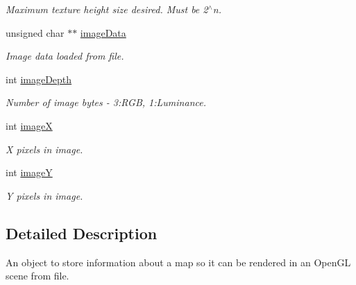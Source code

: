 \begin{DoxyCompactItemize}
\begin{DoxyCompactList}\small\item\em Maximum texture height size desired. Must be 2$^\wedge$n. \end{DoxyCompactList}\item 
\hypertarget{class_geomap3_d_af2812be26b02da4603e32159f199d3de}{
unsigned char $\ast$$\ast$ \hyperlink{class_geomap3_d_af2812be26b02da4603e32159f199d3de}{imageData}}
\label{class_geomap3_d_af2812be26b02da4603e32159f199d3de}

\begin{DoxyCompactList}\small\item\em Image data loaded from file. \end{DoxyCompactList}\item 
\hypertarget{class_geomap3_d_a6eb34415f8711c175c3e2de62fce649f}{
int \hyperlink{class_geomap3_d_a6eb34415f8711c175c3e2de62fce649f}{imageDepth}}
\label{class_geomap3_d_a6eb34415f8711c175c3e2de62fce649f}

\begin{DoxyCompactList}\small\item\em Number of image bytes -\/ 3:RGB, 1:Luminance. \end{DoxyCompactList}\item 
\hypertarget{class_geomap3_d_a727dff35321b9f86360873dea21825d3}{
int \hyperlink{class_geomap3_d_a727dff35321b9f86360873dea21825d3}{imageX}}
\label{class_geomap3_d_a727dff35321b9f86360873dea21825d3}

\begin{DoxyCompactList}\small\item\em X pixels in image. \end{DoxyCompactList}\item 
\hypertarget{class_geomap3_d_afa780dc6562152adfc5226951aca934d}{
int \hyperlink{class_geomap3_d_afa780dc6562152adfc5226951aca934d}{imageY}}
\label{class_geomap3_d_afa780dc6562152adfc5226951aca934d}

\begin{DoxyCompactList}\small\item\em Y pixels in image. \end{DoxyCompactList}\end{DoxyCompactItemize}


\subsection{Detailed Description}
An object to store information about a map so it can be rendered in an OpenGL scene from file. 

